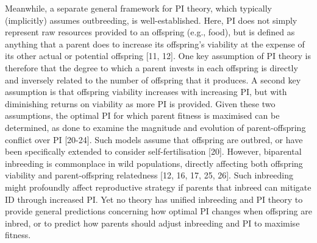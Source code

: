\documentclass[12pt]{article}
\begin{document}
Meanwhile, a separate general framework for PI theory, which typically (implicitly) assumes outbreeding, is well-established. Here, PI does not simply represent raw resources provided to an offspring (e.g., food), but is defined as anything that a parent does to increase its offspring's viability at the expense of its other actual or potential offspring [11, 12]. One key assumption of PI theory is therefore that the degree to which a parent invests in each offspring is directly and inversely related to the number of offspring that it produces. A second key assumption is that offspring viability increases with increasing PI, but with diminishing returns on viability as more PI is provided. Given these two assumptions, the optimal PI for which parent fitness is maximised can be determined, as done to examine the magnitude and evolution of parent-offspring conflict over PI [20-24]. Such models assume that offspring are outbred, or have been specifically extended to consider self-fertilisation [20]. However, biparental inbreeding is commonplace in wild populations, directly affecting both offspring viability and parent-offspring relatedness [12, 16, 17, 25, 26]. Such inbreeding might profoundly affect reproductive strategy if parents that inbreed can mitigate ID through increased PI. Yet no theory has unified inbreeding and PI theory to provide general predictions concerning how optimal PI changes when offspring are inbred, or to predict how parents should adjust inbreeding and PI to maximise fitness. 
\end{document}
